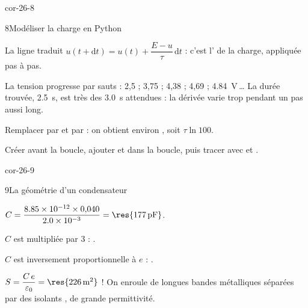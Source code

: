 \begin{blocLivre}{cor-26-8}
\begin{corrige}{8}{Modéliser la charge en Python}
\begin{questions}
\item La ligne traduit $u(t+\mathrm{d}t)=u(t)+\dfrac{E-u}{\tau}\,\mathrm{d}t$ : c'est l' de la charge, appliquée
pas à pas.
\item La tension progresse par sauts : 2,5 ; 3,75 ; 4,38 ; 4,69 ; \qty{4,84}{V}\,\dots{} La durée trouvée, \qty{2,5}{s}, est très
 des \qty{3,0}{s} attendues : la dérivée varie trop pendant un pas aussi long.
\item Remplacer  par  et  par  : on obtient environ , soit
$\tau\ln100$.
\item Créer  avant la boucle, ajouter  et  dans la boucle, puis tracer avec
 et .
\end{questions}
\end{corrige}
\end{blocLivre}
\begin{blocLivre}{cor-26-9}
\begin{corrige}{9}{La géométrie d'un condensateur}
\begin{questions}
\item $C=\dfrac{\num{8.85e-12}\times0{,}040}{\num{2.0e-3}}=\res{\qty{177}{pF}}$.
\item $C$ est multipliée par 3 : .
\item $C$ est inversement proportionnelle à $e$ : .
\item $S=\dfrac{C\,e}{\varepsilon_0}=\res{\qty{226}{m^2}}$ ! On enroule de longues bandes métalliques séparées par des isolants
, de grande permittivité.
\end{questions}
\end{corrige}
\end{blocLivre}
